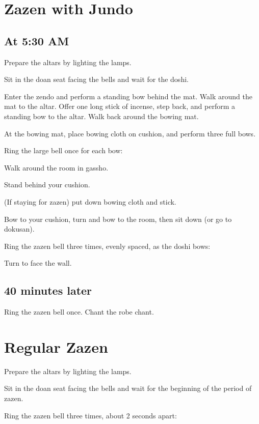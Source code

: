 \documentclass{chantbook}
\begin{document}
\begin{services}

\chapter{Zazen with Jundo}

\renewcommand{\footmark}{\bellkey}
\section*{At 5:30 AM}

\doan Prepare the altars by lighting the lamps.

Sit in the doan seat facing the bells and wait for the doshi.

\doshi Enter the zendo and perform a standing bow behind the mat. Walk around
the mat to the altar. Offer one long stick of incense, step back, and perform a
standing bow to the altar. Walk back around the bowing mat.

At the bowing mat, place bowing cloth on cushion, and perform three full bows.

\doan Ring the large bell once for each bow:
\jundoBows

\doshi Walk around the room in gassho.

Stand behind your cushion.

(If staying for zazen) put down bowing cloth and stick.

Bow to your cushion, turn and bow to the room, then sit down (or go to dokusan).

\doan Ring the zazen bell three times, evenly spaced, as the doshi bows:
\jundoStartZazen

Turn to face the wall.

\section*{40 minutes later}
\doan Ring the zazen bell once. \bigspace\zazenbell
\sangha Chant the robe chant.

\chapter{Regular Zazen}
\doan Prepare the altars by lighting the lamps.

Sit in the doan seat facing the bells and wait for the beginning of the period
of zazen.

\doan Ring the zazen bell three times, about 2 seconds apart:
\startZazenBells


\end{services}
\end{document}

